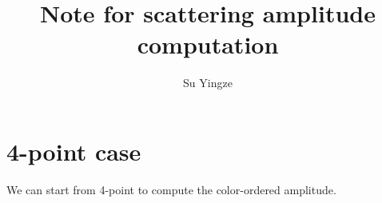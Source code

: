 \documentclass[12pt]{article}
\begin{document}
\title{Note for scattering amplitude computation}
\author{Su Yingze}
\maketitle
\section{4-point case}
We can start from 4-point to compute the color-ordered amplitude.
\end{document}
